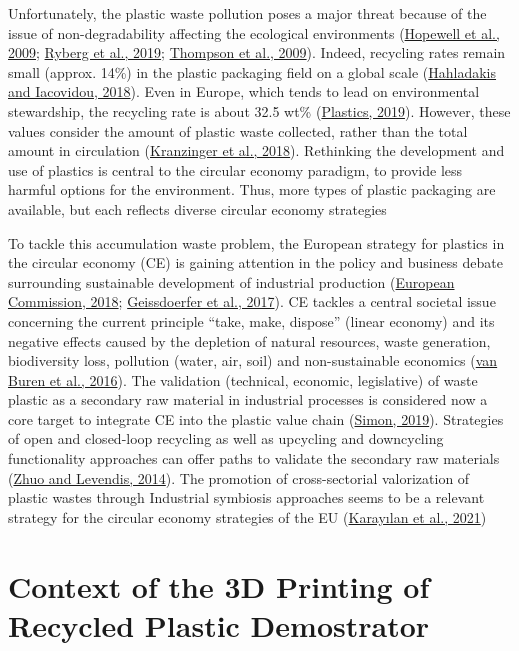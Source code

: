 \documentclass[
  11pt,
]{article}
\begin{document}
Unfortunately, the plastic waste pollution poses a major threat because
of the issue of non-degradability affecting the ecological environments
(\protect\hyperlink{ref-Hopewell2009}{Hopewell et al., 2009};
\protect\hyperlink{ref-Ryberg2019}{Ryberg et al., 2019};
\protect\hyperlink{ref-Thompson2009b}{Thompson et al., 2009}). Indeed,
recycling rates remain small (approx. 14\%) in the plastic packaging
field on a global scale
(\protect\hyperlink{ref-Hahladakis2018}{Hahladakis and Iacovidou,
2018}). Even in Europe, which tends to lead on environmental
stewardship, the recycling rate is about 32.5 wt\%
(\protect\hyperlink{ref-Plastics2019}{Plastics, 2019}). However, these
values consider the amount of plastic waste collected, rather than the
total amount in circulation
(\protect\hyperlink{ref-Kranzinger2018}{Kranzinger et al., 2018}).
Rethinking the development and use of plastics is central to the
circular economy paradigm, to provide less harmful options for the
environment. Thus, more types of plastic packaging are available, but
each reflects diverse circular economy strategies

To tackle this accumulation waste problem, the European strategy for
plastics in the circular economy (CE) is gaining attention in the policy
and business debate surrounding sustainable development of industrial
production (\protect\hyperlink{ref-EC2018}{European Commission, 2018};
\protect\hyperlink{ref-Geissdoerfer2017}{Geissdoerfer et al., 2017}). CE
tackles a central societal issue concerning the current principle
``take, make, dispose'' (linear economy) and its negative effects caused
by the depletion of natural resources, waste generation, biodiversity
loss, pollution (water, air, soil) and non-sustainable economics
(\protect\hyperlink{ref-VanBuren2016}{van Buren et al., 2016}). The
validation (technical, economic, legislative) of waste plastic as a
secondary raw material in industrial processes is considered now a core
target to integrate CE into the plastic value chain
(\protect\hyperlink{ref-Simon2019}{Simon, 2019}). Strategies of open and
closed-loop recycling as well as upcycling and downcycling functionality
approaches can offer paths to validate the secondary raw materials
(\protect\hyperlink{ref-Zhuo2014}{Zhuo and Levendis, 2014}). The
promotion of cross-sectorial valorization of plastic wastes through
Industrial symbiosis approaches seems to be a relevant strategy for the
circular economy strategies of the EU
(\protect\hyperlink{ref-Karaylan2021}{Karayılan et al., 2021})

\hypertarget{context-of-the-3d-printing-of-recycled-plastic-demostrator}{%
\section{Context of the 3D Printing of Recycled Plastic
Demostrator}\label{context-of-the-3d-printing-of-recycled-plastic-demostrator}}
\end{document}
